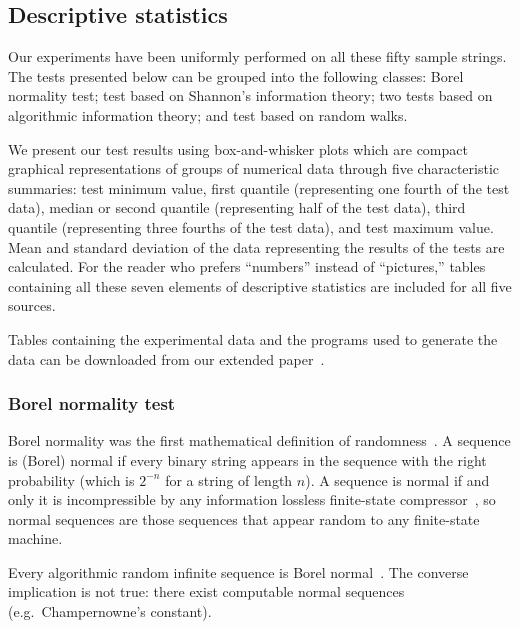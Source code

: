 \documentclass[10pt]{article}%
\begin{document}
\subsection{Descriptive statistics}

  Our experiments have been uniformly performed on all these fifty sample strings.
The tests presented below can be grouped into the following classes: Borel normality test;
test based on Shannon's information theory;
two tests  based on algorithmic information theory; and
test based on random walks.


We present our test results using
box-and-whisker plots which are compact graphical representations of
groups of numerical data through five characteristic summaries:
 test minimum value, first quantile (representing one fourth of the test data), median or second quantile (representing half of the test data), third quantile (representing three fourths of the test data), and test maximum value.
Mean and standard deviation of the data representing the results of the tests are calculated.
For the reader who prefers ``numbers'' instead of ``pictures,'' tables containing
all these seven elements of descriptive statistics are included for all five sources.

Tables containing the experimental data and the programs used
to generate the data can be downloaded from our extended paper~\cite{CDMTCS372}.

\subsubsection{Borel normality test}

Borel normality was the first mathematical definition of randomness~\cite{borel:09}.
A sequence is (Borel) normal if every  binary string appears in the sequence with the right probability
(which is $2^{-n}$ for a string of length $n$).
A  sequence is normal if and only  it  is incompressible by any information lossless finite-state compressor~\cite{ZL:1978}, so  normal sequences are  those sequences  that appear random to any finite-state machine.


Every algorithmic random infinite sequence is Borel normal~\cite{DBLP:conf/dlt/Calude93}.
 The converse implication is not true:
there exist computable normal sequences (e.g.\  Champernowne's constant).
\end{document}
